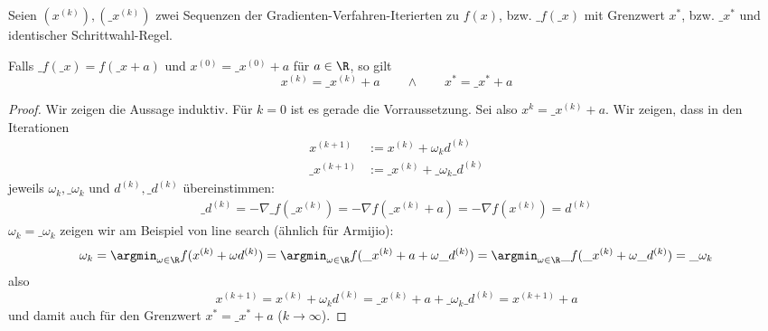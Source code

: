 \documentclass[11pt]{scrartcl}
\begin{document}
\begin{lem*}[Translationsinvarianz]
	Seien $(x^{(k)}), (\_x^{(k)})$ zwei Sequenzen der Gradienten-Verfahren-Iterierten zu $f(x)$, bzw. $\_f(\_x)$ mit Grenzwert $x^*$, bzw. $\_x^*$ und identischer Schrittwahl-Regel.

	Falls $\_f(\_x) = f(\_x + a)$ und $x^{(0)} = \_x^{(0)} + a$ für $a \in \R$, so gilt
	\[
		x^{(k)} = \_x^{(k)} + a
		\qquad \land \qquad
		x^* = \_x^* + a
	\]
	\begin{proof}
		Wir zeigen die Aussage induktiv.
		Für $k=0$ ist es gerade die Vorraussetzung.
		Sei also $x^{k} = \_x^{(k)} + a$.
		Wir zeigen, dass in den Iterationen
		\begin{align*}
			x^{(k+1)} &:= x^{(k)} + \omega_k d^{(k)} \\
			\_x^{(k+1)} &:= \_x^{(k)} + \_\omega_k \_d^{(k)}
		\end{align*}
		jeweils $\omega_k, \_\omega_k$ und $d^{(k)}, \_d^{(k)}$ übereinstimmen:
		\begin{align*}
			\_d^{(k)} = -\nabla \_f(\_x^{(k)}) = - \nabla f(\_x^{(k)} + a) = - \nabla f(x^{(k)}) = d^{(k)}
		\end{align*}
		$\omega_k = \_\omega_k$ zeigen wir am Beispiel von line search (ähnlich für Armijio):
		\[
			\omega_k = \argmin_{\omega\in\R} f(x^{(k)} + \omega d^{(k)}) = \argmin_{\omega\in \R} f(\_x^{(k)} + a + \omega \_d^{(k)})  = \argmin_{\omega\in \R} \_f(\_x^{(k)} + \omega \_d^{(k)}) = \_\omega_k
		\]
		also
		\[
			x^{(k+1)} = x^{(k)} + \omega_k d^{(k)} = \_x^{(k)} + a + \_\omega_k \_d^{(k)} = x^{(k+1)} +a
		\]
		und damit auch für den Grenzwert $x^* = \_x^* + a$ ($k \to \infty$).
	\end{proof}
\end{lem*}
\end{document}
